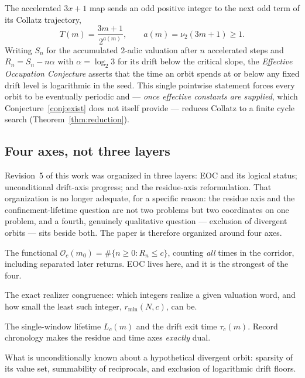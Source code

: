 \documentclass[11pt]{article}
\theoremstyle{plain}
\theoremstyle{definition}
\theoremstyle{remark}
\newcommand{\Occ}{\mathcal{O}}
\newcommand{\al}{\alpha}
\newcommand{\rmin}{r_{\min}}
\begin{document}
The accelerated $3x+1$ map sends an odd positive integer to the next odd term of its Collatz
trajectory,
\[
T(m)=\frac{3m+1}{2^{a(m)}},\qquad a(m)=\nu_2(3m+1)\ge 1 .
\]
Writing $S_n$ for the accumulated $2$-adic valuation after $n$ accelerated steps and
$R_n=S_n-n\al$ with $\al=\log_2 3$ for its drift below the critical slope, the \emph{Effective
Occupation Conjecture} asserts that the time an orbit spends at or below any fixed drift level is
logarithmic in the seed. This single pointwise statement forces every orbit to be eventually
periodic and --- \emph{once effective constants are supplied}, which
Conjecture~\ref{conj:exist} does not itself provide --- reduces Collatz to a finite cycle search
(Theorem~\ref{thm:reduction}).

\subsection{Four axes, not three layers}

Revision~5 of this work was organized in three layers: EOC and its logical status; unconditional
drift-axis progress; and the residue-axis reformulation. That organization is no longer adequate,
for a specific reason: the residue axis and the confinement-lifetime question are not two problems
but two coordinates on one problem, and a fourth, genuinely qualitative question --- exclusion of
divergent orbits --- sits beside both. The paper is therefore organized around four axes.

\begin{description}[leftmargin=2.2em,style=nextline]
\item[Occupation axis (\S\ref{sec:occupation})] The functional $\Occ_c(m_0)=\#\{n\ge 0:R_n\le c\}$,
  counting \emph{all} times in the corridor, including separated later returns. EOC lives here, and
  it is the strongest of the four.
\item[Residue axis (\S\ref{sec:residue})] The exact realizer congruence: which integers realize a
  given valuation word, and how small the least such integer, $\rmin(N,c)$, can be.
\item[Time axis (\S\ref{sec:time})] The single-window lifetime $L_c(m)$ and the drift exit time
  $\tau_c(m)$. Record chronology makes the residue and time axes \emph{exactly} dual.
\item[Divergence axis (\S\ref{sec:divergence})] What is unconditionally known about a hypothetical
  divergent orbit: sparsity of its value set, summability of reciprocals, and exclusion of
  logarithmic drift floors.
\end{description}
\end{document}
